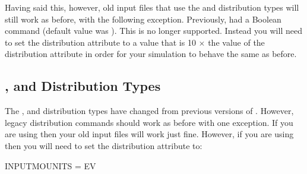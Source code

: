 Having said this, however, old input files that use the  and  distribution types will still work as before, with the following exception. Previously, \opal had a Boolean  command  (default value was ). This  is no longer supported. Instead you will need to set the distribution attribute   to a value that is 10 $\times$ the value of the distribution attribute   in order for your simulation to behave the same as before.


\subsection{,  and  Distribution Types}
The  ,   and   distribution types have changed from previous versions of \opal. However, legacy distribution commands should work as before with one exception. If you are using \opalcycl then your old input files will work just fine. However, if you are using \opalt then you will need to set the distribution attribute   to:
\begin{example}
INPUTMOUNITS = EV
\end{example}